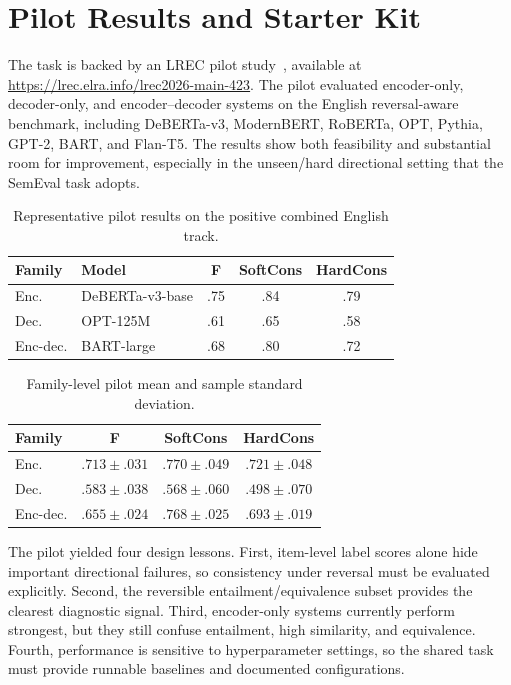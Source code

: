 \documentclass[11pt]{article}
\begin{document}
\section{Pilot Results and Starter Kit}

The task is backed by an LREC pilot study~\cite{apaolaza-etal-2026-assessing}, available at \url{https://lrec.elra.info/lrec2026-main-423}.
The pilot evaluated encoder-only, decoder-only, and encoder--decoder systems on the English reversal-aware benchmark, including DeBERTa-v3, ModernBERT, RoBERTa, OPT, Pythia, GPT-2, BART, and Flan-T5.
The results show both feasibility and substantial room for improvement, especially in the unseen/hard directional setting that the SemEval task adopts.

\begin{table}[h]
\centering
\scriptsize
\setlength{\tabcolsep}{3pt}
\begin{tabular}{@{}llccc@{}}
\toprule
Family & Model & F & SoftCons & HardCons \\
\midrule
Enc. & DeBERTa-v3-base & .75 & .84 & .79 \\
Dec. & OPT-125M & .61 & .65 & .58 \\
Enc-dec. & BART-large & .68 & .80 & .72 \\
\bottomrule
\end{tabular}
\caption{Representative pilot results on the positive combined English track.}
\label{tab:pilot-representative}
\end{table}

\begin{table}[h]
\centering
\scriptsize
\setlength{\tabcolsep}{3pt}
\begin{tabular}{@{}lccc@{}}
\toprule
Family & F & SoftCons & HardCons \\
\midrule
Enc. & \(.713{\pm}.031\) & \(.770{\pm}.049\) & \(.721{\pm}.048\) \\
Dec. & \(.583{\pm}.038\) & \(.568{\pm}.060\) & \(.498{\pm}.070\) \\
Enc-dec. & \(.655{\pm}.024\) & \(.768{\pm}.025\) & \(.693{\pm}.019\) \\
\bottomrule
\end{tabular}
\caption{Family-level pilot mean and sample standard deviation.}
\label{tab:pilot-family}
\end{table}

The pilot yielded four design lessons.
First, item-level label scores alone hide important directional failures, so consistency under reversal must be evaluated explicitly.
Second, the reversible entailment/equivalence subset provides the clearest diagnostic signal.
Third, encoder-only systems currently perform strongest, but they still confuse entailment, high similarity, and equivalence.
Fourth, performance is sensitive to hyperparameter settings, so the shared task must provide runnable baselines and documented configurations.
\end{document}
